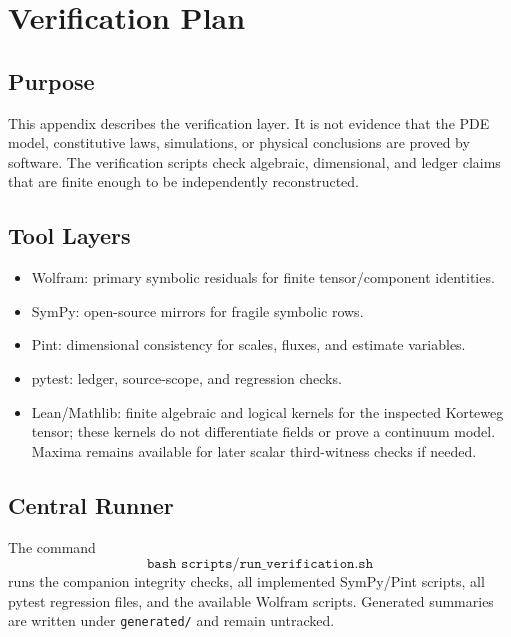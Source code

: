 \section{Verification Plan}
\label{app:verification-plan}


\subsection*{Purpose}

This appendix describes the verification layer. It is not evidence that the PDE
model, constitutive laws, simulations, or physical conclusions are proved by
software.  The verification scripts check algebraic, dimensional, and ledger
claims that are finite enough to be independently reconstructed.

\subsection*{Tool Layers}

\begin{itemize}
\item Wolfram: primary symbolic residuals for finite tensor/component identities.
\item SymPy: open-source mirrors for fragile symbolic rows.
\item Pint: dimensional consistency for scales, fluxes, and estimate variables.
\item pytest: ledger, source-scope, and regression checks.
\item Lean/Mathlib: finite algebraic and logical kernels for the inspected
  Korteweg tensor; these kernels do not differentiate fields or prove a
  continuum model.  Maxima remains available for later scalar third-witness
  checks if needed.
\end{itemize}

\subsection*{Central Runner}

The command
\[
\texttt{bash scripts/run\_verification.sh}
\]
runs the companion integrity checks, all implemented SymPy/Pint scripts, all
pytest regression files, and the available Wolfram scripts.  Generated summaries
are written under \texttt{generated/} and remain untracked.


